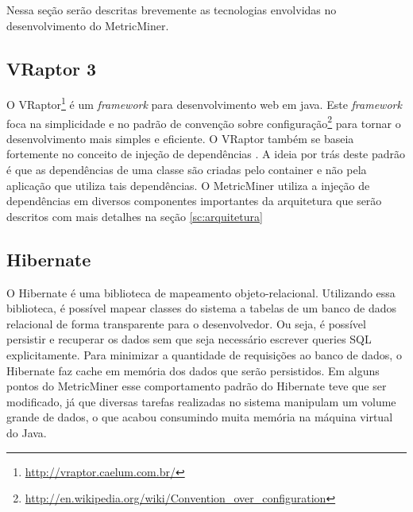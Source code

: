 \documentclass[a4paper, 12pt, twoside]{book}
\begin{document}
        Nessa seção serão descritas brevemente as tecnologias envolvidas no desenvolvimento do MetricMiner.

        \subsection*{VRaptor 3}
            O VRaptor\footnote{\url{http://vraptor.caelum.com.br/}} é um \textit{framework} para desenvolvimento 
            web em java. Este \textit{framework} foca na simplicidade e no padrão de convenção sobre 
            configuração\footnote{\url{http://en.wikipedia.org/wiki/Convention_over_configuration}} para tornar o 
            desenvolvimento mais simples e eficiente. O VRaptor também se baseia fortemente no conceito de injeção 
            de dependências \cite{fowlerdi}. A ideia por trás deste padrão é que as dependências de uma classe 
            são criadas pelo container e não pela aplicação que utiliza tais dependências. O MetricMiner utiliza a 
            injeção de dependências em diversos componentes importantes da arquitetura que serão descritos com 
            mais detalhes na seção \ref{sc:arquitetura}

        \subsection*{Hibernate}
            O Hibernate é uma biblioteca de mapeamento objeto-relacional. Utilizando essa biblioteca, é possível 
            mapear classes do sistema a tabelas de um banco de dados relacional de forma transparente para o 
            desenvolvedor. Ou seja, é possível persistir e recuperar os dados sem que seja necessário escrever 
            queries SQL explicitamente. Para minimizar a  quantidade de requisições ao banco de dados, o Hibernate 
            faz cache em memória dos dados que serão persistidos. Em alguns pontos do MetricMiner esse 
            comportamento padrão do Hibernate teve que ser modificado, já que diversas tarefas realizadas no 
            sistema manipulam um volume grande de dados, o que acabou consumindo muita memória na máquina virtual 
            do Java.
\end{document}
